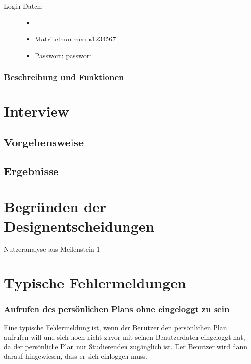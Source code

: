 \documentclass[a4paper,10pt]{scrartcl}
\begin{document}
\begin{description}
 \item[Login-Daten:] 
 \begin{itemize}
  \item[]
  \item Matrikelnummer: a1234567
  \item Passwort: passwort
 \end{itemize}

\end{description}

\subsubsection*{Beschreibung und Funktionen}

\section*{Interview}

\subsection*{Vorgehensweise}

\subsection*{Ergebnisse}

\section*{Begründen der Designentscheidungen}
Nutzeranalyse aus Meilenstein 1

\section*{Typische Fehlermeldungen}

\subsubsection*{Aufrufen des persönlichen Plans ohne eingeloggt zu sein}

Eine typische Fehlermeldung ist, wenn der Benutzer den persönlichen Plan aufrufen will und sich noch nicht zuvor mit seinen Benutzerdaten eingeloggt hat,
da der persönliche Plan nur Studierenden zugänglich ist. Der Benutzer wird dann darauf hingewiesen, dass er sich einloggen muss.
\end{document}
